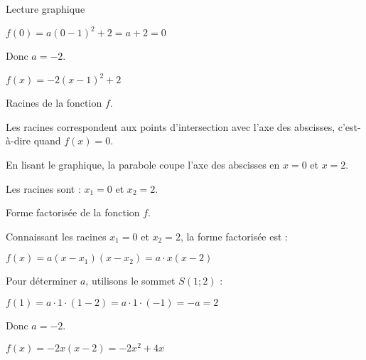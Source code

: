 \begin{EXO}{Lecture graphique}{}
\begin{tcbenumerate}[2]
$f(0) = a(0-1)^2 + 2 = a + 2 = 0$

Donc $a = -2$.

$f(x) = -2(x-1)^2 + 2$

\tcbitem Racines de la fonction $f$.

Les racines correspondent aux points d'intersection avec l'axe des abscisses, c'est-à-dire quand $f(x) = 0$.

En lisant le graphique, la parabole coupe l'axe des abscisses en $x = 0$ et $x = 2$.

Les racines sont : $x_1 = 0$ et $x_2 = 2$.

\tcbitem Forme factorisée de la fonction $f$.

Connaissant les racines $x_1 = 0$ et $x_2 = 2$, la forme factorisée est :

$f(x) = a(x-x_1)(x-x_2) = a \cdot x(x-2)$

Pour déterminer $a$, utilisons le sommet $S(1 ; 2)$ :

$f(1) = a \cdot 1 \cdot (1-2) = a \cdot 1 \cdot (-1) = -a = 2$

Donc $a = -2$.

$f(x) = -2x(x-2) = -2x^2 + 4x$

\end{tcbenumerate}

\end{EXO}
\def\rdifficulty{2}

